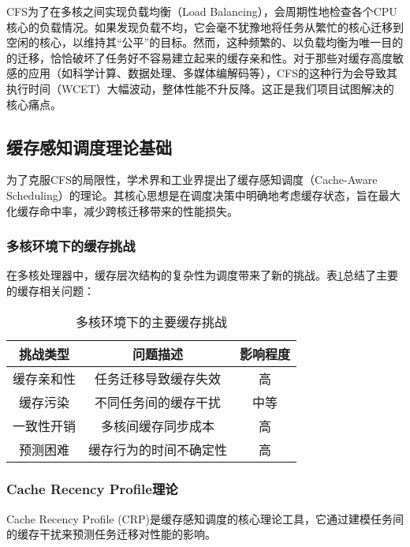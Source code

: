 CFS为了在多核之间实现负载均衡（Load Balancing），会周期性地检查各个CPU核心的负载情况。如果发现负载不均，它会毫不犹豫地将任务从繁忙的核心迁移到空闲的核心，以维持其“公平”的目标。然而，这种频繁的、以负载均衡为唯一目的的迁移，恰恰破坏了任务好不容易建立起来的缓存亲和性。对于那些对缓存高度敏感的应用（如科学计算、数据处理、多媒体编解码等），CFS的这种行为会导致其执行时间（WCET）大幅波动，整体性能不升反降。这正是我们项目试图解决的核心痛点。

\subsection{缓存感知调度理论基础}

为了克服CFS的局限性，学术界和工业界提出了缓存感知调度（Cache-Aware Scheduling）的理论。其核心思想是在调度决策中明确地考虑缓存状态，旨在最大化缓存命中率，减少跨核迁移带来的性能损失。

\subsubsection{多核环境下的缓存挑战}

在多核处理器中，缓存层次结构的复杂性为调度带来了新的挑战。\cite{r4_Cache-Aware_Partitioned_Scheduler_for_Hard_Real-Time}表\ref{tab:cache-challenges}总结了主要的缓存相关问题：

\begin{table}[H]
\centering
\begin{tabular}{ccc}
\toprule
挑战类型 & 问题描述 & 影响程度 \\
\midrule
缓存亲和性 & 任务迁移导致缓存失效 & 高 \\
\midrule
缓存污染 & 不同任务间的缓存干扰 & 中等 \\
\midrule
一致性开销 & 多核间缓存同步成本 & 高 \\
\midrule
预测困难 & 缓存行为的时间不确定性 & 高 \\
\bottomrule
\end{tabular}
\caption{多核环境下的主要缓存挑战}
\label{tab:cache-challenges}
\end{table}

\subsubsection{Cache Recency Profile理论}

Cache Recency Profile (CRP)是缓存感知调度的核心理论工具，它通过建模任务间的缓存干扰来预测任务迁移对性能的影响。\cite{r6_Miss_Rate_Calculation_of_L2Cache}

